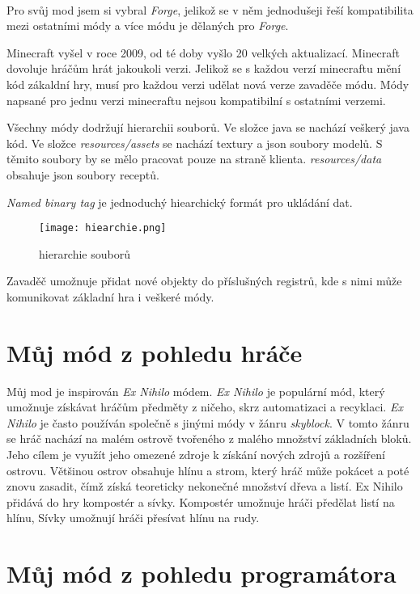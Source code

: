 \documentclass[FM,RP]{tulthesis}
\begin{document}
\\
Pro svůj mod jsem si vybral \textit{Forge}, jelikož se v něm jednodušeji řeší kompatibilita mezi ostatními módy a více módu je dělaných pro \textit{Forge}.

Minecraft vyšel v roce 2009, od té doby vyšlo 20 velkých aktualizací. Minecraft dovoluje hráčům hrát jakoukoli verzi. Jelikož se s každou verzí minecraftu mění kód zákaldní hry, musí pro každou verzi udělat nová verze zavaděče módu. Módy napsané pro jednu verzi minecraftu nejsou kompatibilní s ostatními verzemi.


Všechny módy dodržují hierarchii souborů. Ve složce java se nachází veškerý java kód. Ve složce \textit{resources/assets} se nachází textury a json soubory modelů. S těmito soubory by se mělo pracovat pouze na straně klienta.
\textit{resources/data} obsahuje json soubory receptů. 

\textit{Named binary tag} je jednoduchý hiearchický formát pro ukládání dat.
\begin{figure}
    \centering
    \texttt{[image: hiearchie.png]}
    \caption{hierarchie souborů}
    \label{fig:enter-label}
\end{figure}

Zavaděč umožnuje přidat nové objekty do příslušných registrů, kde s nimi může komunikovat základní hra i veškeré módy. 
\chapter{Můj mód z pohledu hráče}
Můj mod je inspirován \textit{Ex Nihilo} módem. \textit{Ex Nihilo} je populární mód, který umožnuje získávat hráčům předměty z ničeho, skrz automatizaci a recyklaci. \textit{Ex Nihilo} je často používán společně s jinými módy v žánru \textit{skyblock}. V tomto žánru se hráč nachází na malém ostrově tvořeného z malého množství základních bloků. Jeho cílem je využít jeho omezené zdroje k získání nových zdrojů a rozšíření ostrovu. Většinou ostrov obsahuje hlínu a strom, který hráč může pokácet a poté znovu zasadit, čímž získá teoreticky nekonečné množství dřeva a listí. Ex Nihilo přidává do hry kompostér a sívky. Kompostér umožnuje hráči předělat listí na hlínu, Sívky umožnují hráči přesívat hlínu na rudy.

\chapter{Můj mód z pohledu programátora}
\end{document}
